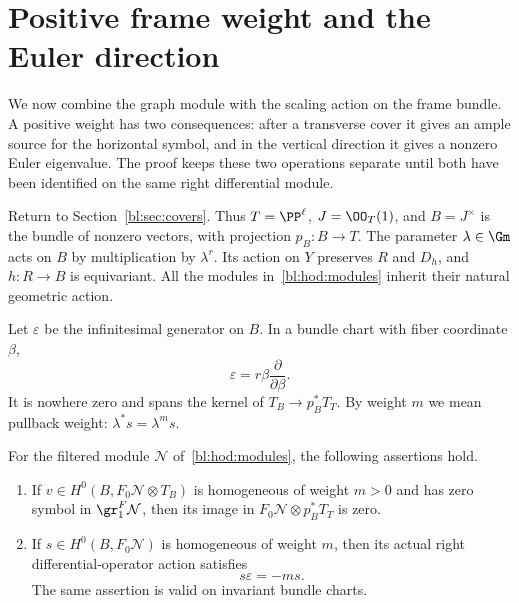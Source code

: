 \section{Positive frame weight and the Euler direction}
\label{bl:sec:frames}

We now combine the graph module with the scaling action on the
frame bundle. A positive weight has two consequences: after a
transverse cover it gives an ample source for the horizontal symbol,
and in the vertical direction it gives a nonzero Euler eigenvalue.
The proof keeps these two operations separate until both have been
identified on the same right differential module.

Return to Section~\ref{bl:sec:covers}. Thus $T=\PP^\ell$,
$J=\OO_T(1)$, and $B=J^\times$ is the bundle of
nonzero vectors, with projection $p_B:B\to T$. The parameter
$\lambda\in\Gm$ acts on $B$ by multiplication by $\lambda^r$.
Its action on $Y$ preserves $R$ and $D_h$, and $h:R\to B$ is
equivariant. All the modules in~\eqref{bl:hod:modules} inherit their
natural geometric action.

Let $\varepsilon$ be the infinitesimal generator on $B$. In a
bundle chart with fiber coordinate $\beta$,
\begin{equation}\label{bl:frm:euler}
 \varepsilon=r\beta\frac{\partial}{\partial\beta}.
\end{equation}
It is nowhere zero and spans the kernel of
$T_B\to p_B^*T_T$. By weight $m$ we mean pullback weight:
$\lambda^*s=\lambda^m s$.

\begin{proposition}
\label{bl:prop:frame-positivity}
For the filtered module $\mathcal N$ of~\eqref{bl:hod:modules}, the
following assertions hold.
\begin{enumerate}[label=\textup{(\roman*)}]
\item If
$v\in H^0(B,F_0\mathcal N\otimes T_B)$ is homogeneous of weight
$m>0$ and has zero symbol in $\gr_1^F\mathcal N$, then its image
in $F_0\mathcal N\otimes p_B^*T_T$ is zero.
\item If $s\in H^0(B,F_0\mathcal N)$ is homogeneous of weight $m$,
then its actual right differential-operator action satisfies
\begin{equation}\label{bl:frm:euler-action}
 s\varepsilon=-ms.
\end{equation}
The same assertion is valid on invariant bundle charts.
\end{enumerate}
\end{proposition}

